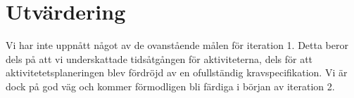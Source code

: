 \section{Utvärdering}
Vi har inte uppnått något av de ovanstående målen för iteration 1. Detta beror dels på att vi underskattade tidsåtgången för aktiviteterna, dels för att aktivitetetsplaneringen blev fördröjd av en ofullständig kravspecifikation. Vi är dock på god väg och kommer förmodligen bli färdiga i början av iteration 2.  